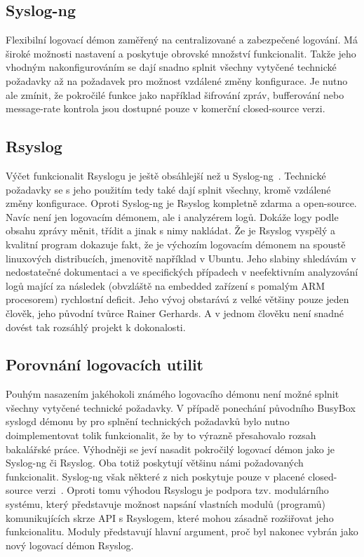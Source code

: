 \documentclass[thesis=B,czech]{FITthesis}[2012/06/26]
\begin{document}
\subsection{Syslog-ng}
Flexibilní logovací démon zaměřený na centralizované a zabezpečené logování. Má široké možnosti nastavení a poskytuje obrovské množství funkcionalit. Takže jeho vhodným nakonfigurováním se dají snadno splnit všechny vytyčené technické požadavky až na požadavek pro možnost vzdálené změny konfigurace.
Je nutno ale zmínit, že pokročilé funkce jako například šifrování zpráv, bufferování nebo message-rate kontrola jsou dostupné pouze v komerční closed-source verzi.

\subsection{Rsyslog}
Výčet funkcionalit Rsyslogu je ještě obsáhlejší než u Syslog-ng~\cite{Rsyslog-features}. Technické požadavky se s jeho použitím tedy také dají splnit všechny, kromě vzdálené změny konfigurace. Oproti Syslog-ng je Rsyslog kompletně zdarma a open-source. Navíc není jen logovacím démonem, ale i analyzérem logů. Dokáže logy podle obsahu zprávy měnit, třídit a jinak s nimy nakládat.
Že je Rsyslog vyspělý a kvalitní program dokazuje fakt, že je výchozím logovacím démonem na spoustě linuxových distribucích, jmenovitě například v Ubuntu.
Jeho slabiny shledávám v nedostatečné dokumentaci a ve specifických případech v neefektivním analyzování logů mající za následek (obvzláště na embedded zařízení s pomalým ARM procesorem) rychlostní deficit. Jeho vývoj obstarává z velké většiny pouze jeden člověk, jeho původní tvůrce Rainer Gerhards. A v jednom člověku není snadné dovést tak rozsáhlý projekt k dokonalosti.

\subsection{Porovnání logovacích utilit}
Pouhým nasazením jakéhokoli známého logovacího démonu není možné splnit všechny vytyčené technické požadavky. V případě ponechání původního BusyBox syslogd démonu by pro splnění technických požadavků bylo nutno doimplementovat tolik funkcionalit, že by to výrazně přesahovalo rozsah bakalářské práce.
Výhodněji se jeví nasadit pokročilý logovací démon jako je Syslog-ng či Rsyslog. Oba totiž poskytují většinu námi požadovaných funkcionalit. Syslog-ng však některé z nich poskytuje pouze v placené closed-source verzi~\cite{syslogNgPremium}.
Oproti tomu výhodou Rsyslogu je podpora tzv. modulárního systému, který představuje možnost napsání vlastních modulů (programů) komunikujících skrze API s Rsyslogem, které mohou zásadně rozšiřovat jeho funkcionalitu. Moduly představují hlavní argument, proč byl nakonec vybrán jako nový logovací démon Rsyslog.
\end{document}
